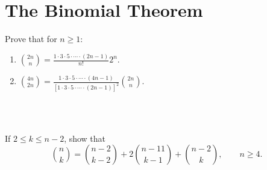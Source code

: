 \section{The Binomial Theorem}

\begin{exercise}
    Prove that for $n \geq 1$:
    \begin{enumerate}
        \item $\displaystyle \binom{2n}{n} = \frac{1\cdot 3 \cdot 5 \cdot \cdots \cdot (2n-1)}{n!}2^n .$
        \item $\displaystyle \binom{4n}{2n} = \frac{1\cdot 3 \cdot 5 \cdot \cdots \cdot (4n-1)}{[1\cdot 3 \cdot 5 \cdot \cdots \cdot (2n-1)]^2}\binom{2n}{n}.$
    \end{enumerate}
\end{exercise}

\begin{solution}
    \\ \td \\
\end{solution}

\begin{exercise}
    If $2\leq k \leq n - 2$, show that
    $$\binom{n}{k} = \binom{n-2}{k-2} + 2\binom{n - 11}{k-1} + \binom{n-2}{k}, \qquad n \geq 4.$$
\end{exercise}

\begin{solution}
    \\ \td 
\end{solution}